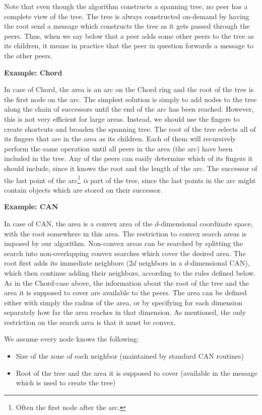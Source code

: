 \documentclass[fleqn,12pt,twoside]{article}
\begin{document}
Note that even though the algorithm constructs a spanning tree, no
peer has a complete view of the tree. The tree is always constructed
on-demand by having the root send a message which constructs the tree
as it gets passed through the peers. Thus, when we say below that a
peer adds some other peers to the tree as its children, it means in
practice that the peer in question forwards a message to the other
peers.

\noindent
\textbf{Example: Chord}

In case of Chord, the area is an arc on the Chord ring and the root of
the tree is the first node on the arc. The simplest solution is simply
to add nodes to the tree along the chain of successors until the end
of the arc has been reached. However, this is not very efficient for
large areas. Instead, we should use the fingers to create shortcuts
and broaden the spanning tree. The root of the tree selects all of its
fingers that are in the area as its children. Each of them will
recursively perform the same operation until all peers in the area
(the arc) have been included in the tree. Any of the peers can easily
determine which of its fingers it should include, since it knows the
root and the length of the arc. The successor of the last point of the
arc\footnote{Often the first node after the arc.} \emph{is} part of
the tree, since the last points in the arc might contain objects which
are stored on their successor.


\noindent
\textbf{Example: CAN}

In case of CAN, the area is a convex area of the $d$-dimensional
coordinate space, with the root somewhere in this area. The
restriction to convex search areas is imposed by our algorithm.
Non-convex areas can be searched by splitting the search into
non-overlapping convex searches which cover the desired area. The root
first adds its immediate neighbors ($2d$ neighbors in a
$d$-dimensional CAN), which then continue adding their neighbors,
according to the rules defined below.  As in the Chord-case above, the
information about the root of the tree and the area it is supposed to
cover are available to the peers.  The area can be defined either with
simply the radius of the area, or by specifying for each dimension
separately how far the area reaches in that dimension.  As mentioned,
the only restriction on the search area is that it must be convex.


We assume every node knows the following:
\begin{itemize}
\item Size of the zone of each neighbor (maintained by standard CAN
  routines)
\item Root of the tree and the area it is supposed to cover (available
  in the message which is used to create the tree)
\end{itemize}
\end{document}
